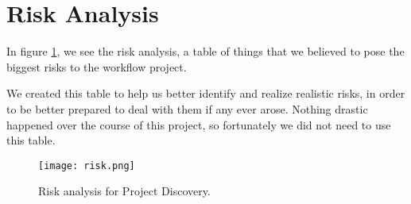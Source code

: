 \section{Risk Analysis}\label{sec:riskanalysis}

In figure \ref{fig:risk}, we see the risk analysis, a table of things that we believed to pose the biggest risks to the workflow project. 

We created this table to help us better identify and realize realistic risks, in order to be better prepared to deal with them if any ever arose. Nothing drastic happened over the course of this project, so fortunately we did not need to use this table.

\begin{figure}[H]
\centering
\graphicspath{ {./graphics/} }
\centerline{\texttt{[image: risk.png]}}
\caption{\label{fig:risk} Risk analysis for Project Discovery.}
\end{figure}

